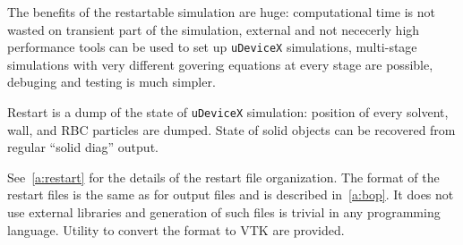 The benefits of the restartable simulation are huge: computational
time is not wasted on transient part of the simulation, external and
not nececerly high performance tools can be used to
set up \texttt{uDeviceX} simulations, multi-stage simulations with very
different govering equations at every stage are possible, debuging and
testing is much simpler.

Restart is a dump of the state of \texttt{uDeviceX} simulation:
position of every solvent, wall, and RBC particles are dumped. State
of solid objects can be recovered from regular ``solid diag'' output.

See~\ref{a:restart} for the details of the restart file
organization. The format of the restart files is the same as for
output files and is described in~\ref{a:bop}. It does not use external
libraries and generation of such files is trivial in any programming
language. Utility to convert the format to VTK are provided.
